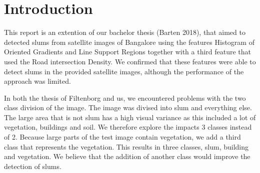 \section{Introduction}
This report is an extention of our bachelor thesis (Barten 2018), that aimed to detected slums from satellite images of Bangalore using the features Histogram of Oriented Gradients and Line Support Regions together with a third feature that used the Road intersection Density. We confirmed that these features were able to detect slums in the provided satellite images, although the performance of the approach was limited. 

In both the thesis of Filtenborg and us, we encountered problems with the two class division of the image. The image was divised into slum and everything else. The large area that is not slum has a high visual variance as this included a lot of vegetation, buildings and soil. We therefore explore the impacts 3 classes instead of 2. Because large parts of the test image contain vegetation, we add a third class that represents the vegetation. This results in three classes, slum, building and vegetation. We believe that the addition of another class would improve the detection of slums.




